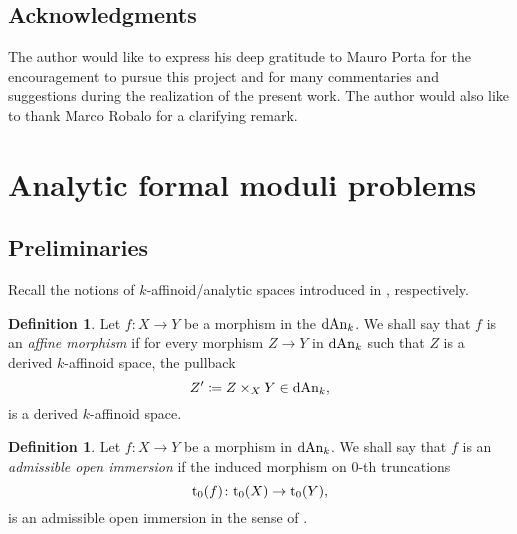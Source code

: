 \documentclass[10pt,a4paper,reqno]{amsart} %
\theoremstyle{plain}
\theoremstyle{definition}
\newtheorem{defin}[thm]{Definition}
\theoremstyle{remark}
\numberwithin{equation}{section}
\begin{document}
\subsection{Acknowledgments} The author would like to express his deep gratitude to Mauro Porta for the encouragement to pursue this project and
for many commentaries and suggestions during the realization of the present work. The author would also like to thank Marco Robalo for a clarifying
remark.

\section{Analytic formal moduli problems}

\subsection{Preliminaries}
Recall the notions of $k$-affinoid/analytic spaces introduced
in \cite[Definition 7.3 and Definition 2.5.]{Porta_Yu_Derived_non-archimedean_analytic_spaces}, respectively.


\begin{defin}
    Let $f \colon X \to Y$ be a morphism in the \infcat $\mathrm{dAn}_k$. We shall say that $f$ is an \emph{affine morphism} if
    for every morphism $Z \to Y$ in $\mathrm{dAn}_k$ such that $Z$ is a derived $k$-affinoid space, the pullback
        \[
            Z' \coloneqq Z \times_X Y \in \mathrm{dAn}_k,  
        \]
    is a derived $k$-affinoid space.
\end{defin}

\begin{defin}
    Let $f \colon X \to Y$ be a morphism in $\mathrm{dAn}_k$. We shall say that $f$ is an \emph{admissible open immersion} if the induced morphism on $0$-th truncations
        \[
            \mathrm{t}_0(f) \colon \mathrm{t}_0(X) \to \mathrm{t}_0(Y),  
        \]
    is an admissible open immersion in the sense of \cite[\S 1.3]{Berkovich_Etale_1993}.
\end{defin}
\end{document}
